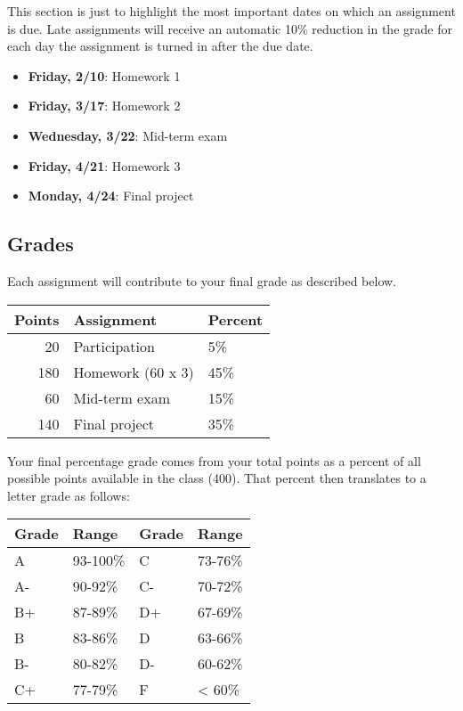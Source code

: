 \documentclass[11pt,]{article}
\providecommand{\tightlist}{%
  \setlength{\itemsep}{0pt}\setlength{\parskip}{0pt}}
\begin{document}
This section is just to highlight the most important dates on which an
assignment is due. Late assignments will receive an automatic 10\%
reduction in the grade for each day the assignment is turned in after
the due date.

\begin{itemize}
\tightlist
\item
  \textbf{Friday, 2/10}: Homework 1
\item
  \textbf{Friday, 3/17}: Homework 2
\item
  \textbf{Wednesday, 3/22}: Mid-term exam
\item
  \textbf{Friday, 4/21}: Homework 3
\item
  \textbf{Monday, 4/24}: Final project
\end{itemize}

\newpage

\hypertarget{grades}{%
\subsection{Grades}\label{grades}}

Each assignment will contribute to your final grade as described below.

\begin{longtable}[]{@{}rll@{}}
\toprule()
Points & Assignment & Percent \\
\midrule()
\endhead
20 & Participation & 5\% \\
180 & Homework (60 x 3) & 45\% \\
60 & Mid-term exam & 15\% \\
140 & Final project & 35\% \\
\bottomrule()
\end{longtable}

Your final percentage grade comes from your total points as a percent of
all possible points available in the class (400). That percent then
translates to a letter grade as follows:

\begin{longtable}[]{@{}llll@{}}
\toprule()
Grade & Range & Grade & Range \\
\midrule()
\endhead
A & 93-100\% & C & 73-76\% \\
A- & 90-92\% & C- & 70-72\% \\
B+ & 87-89\% & D+ & 67-69\% \\
B & 83-86\% & D & 63-66\% \\
B- & 80-82\% & D- & 60-62\% \\
C+ & 77-79\% & F & \textless{} 60\% \\
\bottomrule()
\end{longtable}
\end{document}
